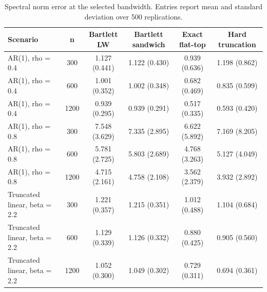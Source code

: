 \begin{table}[!htbp]
\small
\centering
\caption{Spectral norm error at the selected bandwidth. Entries report mean and standard deviation over 500 replications.}
\label{tab:spectral-error}
\begin{tabular}{lccccc}
\toprule
Scenario & n & Bartlett LW & Bartlett sandwich & Exact flat-top & Hard truncation \\
\midrule
AR(1), rho = 0.4 & 300 & 1.127 (0.441) & 1.122 (0.430) & 0.939 (0.636) & 1.198 (0.862) \\
AR(1), rho = 0.4 & 600 & 1.001 (0.352) & 1.002 (0.348) & 0.682 (0.469) & 0.835 (0.599) \\
AR(1), rho = 0.4 & 1200 & 0.939 (0.295) & 0.939 (0.291) & 0.517 (0.335) & 0.593 (0.420) \\
AR(1), rho = 0.8 & 300 & 7.548 (3.629) & 7.335 (2.895) & 6.622 (5.892) & 7.169 (8.205) \\
AR(1), rho = 0.8 & 600 & 5.781 (2.725) & 5.803 (2.689) & 4.768 (3.263) & 5.127 (4.049) \\
AR(1), rho = 0.8 & 1200 & 4.715 (2.161) & 4.758 (2.108) & 3.562 (2.379) & 3.932 (2.892) \\
Truncated linear, beta = 2.2 & 300 & 1.221 (0.357) & 1.215 (0.351) & 1.012 (0.488) & 1.104 (0.684) \\
Truncated linear, beta = 2.2 & 600 & 1.129 (0.339) & 1.126 (0.332) & 0.880 (0.425) & 0.905 (0.560) \\
Truncated linear, beta = 2.2 & 1200 & 1.052 (0.300) & 1.049 (0.302) & 0.729 (0.311) & 0.694 (0.361) \\
\bottomrule
\end{tabular}
\end{table}
